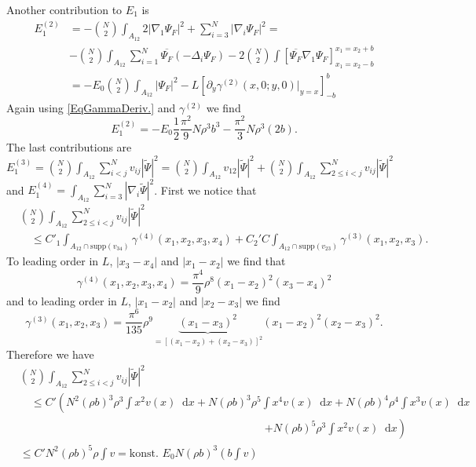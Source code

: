 \documentclass[a4paper,11pt]{article}
\newcommand{\supp}{\text{supp}}
\newcommand{\abs}[1]{\left\lvert #1 \right\rvert}
\newcommand*\diff{\mathop{}\!\mathrm{d}}
\numberwithin{equation}{section}
\begin{document}
	Another contribution to $ E_1 $ is \begin{equation}
	\begin{aligned}
	E_1^{(2)}&=-\binom{N}{2}\int_{A_{12}}2\abs{\nabla_1\Psi_F}^2+\sum_{i=3}^{N}\abs{\nabla_i\Psi_F}^2=\\&-\binom{N}{2}\int_{A_{12}}\sum_{i=1}^{N}\overline{\Psi_F}(-\Delta_i\Psi_F)-2\binom{N}{2}\int\left[\overline{\Psi_F}\nabla_1\Psi_F\right]_{x_1=x_2-b}^{x_1=x_2+b}\\
	&=-E_0\binom{N}{2}\int_{A_{12}}\abs{\Psi_F}^2-L\left[\partial_y\gamma^{(2)}(x,0;y,0)\vert_{y=x}\right]_{-b}^{b}
	\end{aligned}
	\end{equation}
	Again using \eqref{EqGammaDeriv.} and $ \gamma^{(2)} $ we find \begin{equation}
	E_1^{(2)}=-E_0\frac{1}{2}\frac{\pi^2}{9}N\rho^3b^3-\frac{\pi^2}{3}N\rho^3 (2b).
	\end{equation}
	The last contributions are $ E^{(3)}_1=\binom{N}{2}\int_{A_{12}} \sum_{i<j}^{N}v_{ij}\abs{\tilde{\Psi}}^2=\binom{N}{2}\int_{A_{12}}v_{12}\abs{\tilde{\Psi}}^2+\binom{N}{2}\int_{A_{12}} \sum_{2\leq i<j}^{N}v_{ij}\abs{\tilde{\Psi}}^2 $ and $ E_1^{(4)}=\int_{A_{12}}\sum_{i=3}^{N}\abs{\nabla_i\tilde{\Psi}}^2 $.
	First we notice that \begin{equation}
	\begin{aligned}
	&\binom{N}{2}\int_{A_{12}} \sum_{2\leq i<j}^{N}v_{ij}\abs{\tilde{\Psi}}^2\\&\quad\leq C'_1\int_{A_{12}\cap\supp(v_{34})}\gamma^{(4)}(x_1,x_2,x_3,x_4)+C_2'C\int_{A_{12}\cap\supp(v_{23})}\gamma^{(3)}(x_1,x_2,x_3).
	\end{aligned}
	\end{equation}
	To leading order in $ L $, $ \abs{x_3-x_4} $ and $ \abs{x_1-x_2} $ we find that \begin{equation}
	\gamma^{(4)}(x_1,x_2,x_3,x_4)=\frac{\pi^4}{9}\rho^8(x_1-x_2)^2(x_3-x_4)^2
	\end{equation}
	and to leading order in $ L $, $ \abs{x_1-x_2} $ and $ \abs{x_2-x_3} $ we find \begin{equation}
	\gamma^{(3)}(x_1,x_2,x_3)=\frac{\pi^6}{135}\rho^9\underbrace{(x_1-x_3)^2}_{=[(x_1-x_2)+(x_2-x_3)]^2}(x_1-x_2)^2(x_2-x_3)^2.
	\end{equation}
	Therefore we have
	\begin{equation}
	\begin{aligned}
	&\binom{N}{2}\int_{A_{12}} \sum_{2\leq i<j}^{N}v_{ij}\abs{\tilde{\Psi}}^2\\&\quad\leq C' \left(N^2(\rho b)^3\rho^3\int x^2 v(x)\diff x+N(\rho b)^3 \rho^5 \int x^4 v(x)\diff x+N(\rho b)^4\rho^4 \int x^3 v(x)\diff x\right.\\
	&\qquad \qquad \qquad \qquad\hspace{6cm}\left.+N(\rho b)^5 \rho^3 \int x^2 v(x)\diff x\right)\\
	&\leq C' N^2(\rho b)^5\rho \int v=\text{konst. }E_0 N (\rho b)^3 \left(b\int v\right)
	\end{aligned}
	\end{equation}
\end{document}
